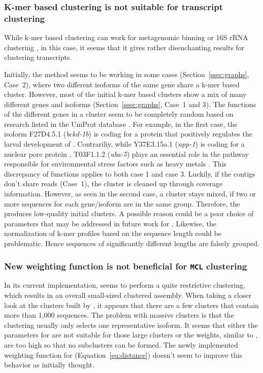\documentclass[12pt,a4paper,english]{article}
\begin{document}
	\subsubsection{K-mer based clustering is not suitable for transcript clustering}
	\label{ssec:discussion:karma}
	While k-mer based clustering can work for metagenomic binning \citep{binning:16} or 16S rRNA clustering \citep{16SrRNA:13}, in this case, it seems that it gives rather disenchanting results for clustering transcripts.

	Initially, the method seems to be working in some cases (Section~\ref{ssec:graphs}, Case~2), where two different isoforms of the same gene share a k-mer based cluster.
	However, most of the initial k-mer based clusters show a mix of many different genes and isoforms (Section~\ref{ssec:graphs}, Case~1 and 3).
    The functions of the different genes in a cluster seem to be completely random based on research listed in the UniProt database \citep{uniprot:18}.
	For example, in the first case, the isoform F27D4.5.1 (\textit{bckd-1b}) is coding for a protein that positively regulates the larval development of \celegans \citep{F27:16}.
	Contrariliy, while Y37E3.15a.1 (\textit{npp-1}) is coding for a nuclear pore protein \citep{Y37:03}, T03F1.1.2 (\textit{uba-5}) plays an essential role in the pathway responsible for environmental stress factors such as heavy metals \citep{T03:13}. This discrepancy of functions applies to both case 1 and case 3.
	Luckily, if the contigs don't share reads (Case~1), the cluster is cleaned up through coverage information. However, as seen in the second case, a cluster stays mixed, if two or more sequences for each gene/isoform are in the same group. Therefore, the \hdbscan produces low-quality initial clusters.
	A possible reason could be a poor choice of parameters that may be addressed in future work for \karma. Likewise, the normalization of k-mer profiles based on the sequence length could be problematic. Hence sequences of significantly different lengths are falsely grouped.
	
	\subsubsection{New weighting function is not beneficial for \texttt{MCL} clustering}
	In its current implementation, \karma seems to perform a quite restrictive clustering, which results in an overall small-sized clustered assembly.
	When taking a closer look at the clusters built by \karma, it appears that there are a few clusters that contain more than 1,000 sequences. The problem with massive clusters is that the \mcl clustering usually only selects one representative isoform. It seems that either the parameters for \mcl are not suitable for those large clusters or the weights, similar to \grouper, are too high so that no subclusters can be formed.
	The newly implemented weighting function for \karma (Equation~\ref{eq:distance}) doesn't seem to improve this behavior as initially thought.
	
\end{document}
